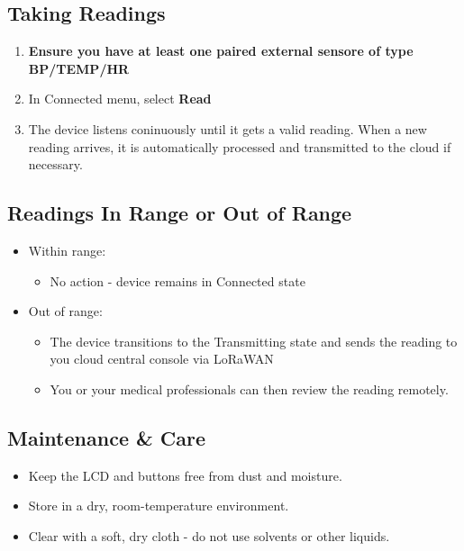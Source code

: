 \subsection{Taking Readings}
\begin{enumerate}
	\item \textbf{Ensure you have at least one paired external sensore of type BP/TEMP/HR}
	\item In Connected menu, select \textbf{Read}
	\item The device listens coninuously until it gets a valid reading. When a new reading arrives, it is automatically processed and transmitted to the cloud if necessary.
\end{enumerate}

\subsection{Readings In Range or Out of Range}
\begin{itemize}
	\item Within range:
	\begin{itemize}
		\item No action - device remains in Connected state
	\end{itemize}
\end{itemize}
\begin{itemize}
	\item Out of range:
	\begin{itemize}
		\item The device transitions to the Transmitting state and sends the reading to you cloud central console via LoRaWAN
		\item You or your medical professionals can then review the reading remotely.
	\end{itemize}
\end{itemize}

\subsection{Maintenance \& Care}
\begin{itemize}
	\item Keep the LCD and buttons free from dust and moisture.
	\item Store in a dry, room-temperature environment.
	\item Clear with a soft, dry cloth - do not use solvents or other liquids.
\end{itemize}

